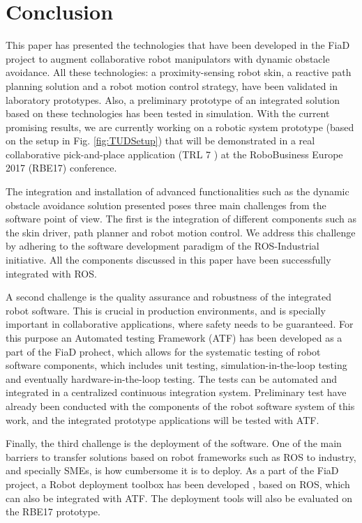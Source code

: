 \section{Conclusion}

This paper has presented the technologies that have been developed in the FiaD
project to augment collaborative robot manipulators with dynamic obstacle
avoidance. All these technologies: a proximity-sensing robot skin, a reactive
path planning solution and a robot motion control strategy, have been validated
in laboratory prototypes. Also, a preliminary prototype of an integrated
solution based on these technologies has been tested in simulation. With the current promising results, we are currently working on a robotic system prototype (based on the setup in Fig. \ref{fig:TUDSetup}) that will be demonstrated in a real collaborative pick-and-place application (TRL 7 \cite{TRL}) at the RoboBusiness Europe 2017 (RBE17) conference.

The integration and installation of advanced functionalities such as the dynamic
obstacle avoidance solution presented poses three main challenges from the
software point of view. The first is the integration of different components such as the skin driver, path planner and robot motion control. We address this challenge by adhering to the software development paradigm of the ROS-Industrial initiative. All the components discussed in this paper have been successfully integrated with ROS.

A second challenge is the quality assurance and robustness of the integrated robot software. This is crucial in production environments, and is specially important in collaborative applications, where safety needs to be guaranteed. For this purpose an Automated testing Framework (ATF) has been developed \cite{Weisshardt-2016} as a part of the FiaD prohect, which
allows for the systematic testing of robot software components, which includes unit
 testing, simulation-in-the-loop testing and eventually hardware-in-the-loop testing.
The tests can be automated and integrated in a centralized continuous
integration system. Preliminary test have already been conducted with the
components of the robot software system of this work, and the integrated
prototype applications will be tested with ATF.

Finally, the third challenge is the deployment of the software. One of the main barriers to transfer solutions based on robot frameworks such as ROS to industry, and specially SMEs, is how cumbersome it is
to deploy. As a part of the FiaD project, a Robot deployment toolbox has been developed \cite{Ludtke-2017}, based on ROS, which can also be integrated with ATF.
The deployment tools will also be evaluated on the RBE17 prototype.


